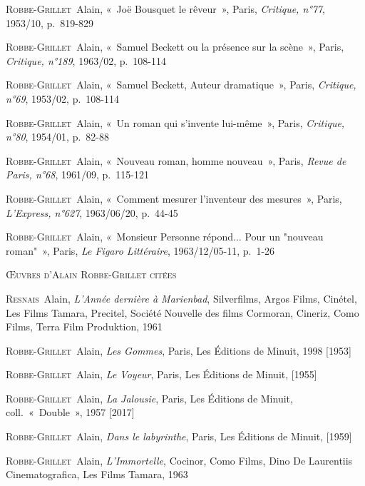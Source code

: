 \documentclass[12pt, a4paper]{article}
\begin{document}
    \textsc{Robbe-Grillet}~Alain, «~Joë Bousquet le rêveur~», Paris, \textit{Critique, n°77}, 1953/10, p.~819-829\par
    \textsc{Robbe-Grillet}~Alain, «~Samuel Beckett ou la présence sur la scène~», Paris, \textit{Critique, n°189}, 1963/02, p.~108-114\par
    \textsc{Robbe-Grillet}~Alain, «~Samuel Beckett, Auteur dramatique~», Paris, \textit{Critique, n°69}, 1953/02, p.~108-114\par
    \textsc{Robbe-Grillet}~Alain, «~Un roman qui s'invente lui-même~», Paris, \textit{Critique, n°80}, 1954/01, p.~82-88\par
    \textsc{Robbe-Grillet}~Alain, «~Nouveau roman, homme nouveau~», Paris, \textit{Revue de Paris, n°68}, 1961/09, p.~115-121\par
    \textsc{Robbe-Grillet}~Alain, «~Comment mesurer l'inventeur des mesures~», Paris, \textit{L'Express, n°627}, 1963/06/20, p.~44-45\par
    \textsc{Robbe-Grillet}~Alain, «~Monsieur Personne répond... Pour un "nouveau roman"~», Paris, \textit{Le Figaro Littéraire}, 1963/12/05-11, p.~1-26\par
    
        \vspace*{2cm}
        \setlength{\parindent}{0cm}
{\large\textsc{Œuvres d'Alain Robbe-Grillet citées}}
        \vspace*{1cm}
        \setlength{\parindent}{25pt}
        
        
        

        
        \textsc{Resnais}~Alain, \textit{L'Année dernière à Marienbad}, Silverfilms, Argos Films, Cinétel, Les Films Tamara, Precitel, Société Nouvelle des films Cormoran, Cineriz, Como Films, Terra Film Produktion, 1961\par 
    \textsc{Robbe-Grillet}~Alain, \textit{Les Gommes}, Paris, Les Éditions de Minuit, 1998 [1953]\par 
    \textsc{Robbe-Grillet}~Alain, \textit{Le Voyeur}, Paris, Les Éditions de Minuit,  [1955]\par 
    \textsc{Robbe-Grillet}~Alain, \textit{La Jalousie}, Paris, Les Éditions de Minuit, coll.~«~Double~», 1957 [2017]\par 
    \textsc{Robbe-Grillet}~Alain, \textit{Dans le labyrinthe}, Paris, Les Éditions de Minuit,  [1959]\par 
    \textsc{Robbe-Grillet}~Alain, \textit{L'Immortelle}, Cocinor, Como Films, Dino De Laurentiis Cinematografica, Les Films Tamara, 1963\par 
    
\end{document}
